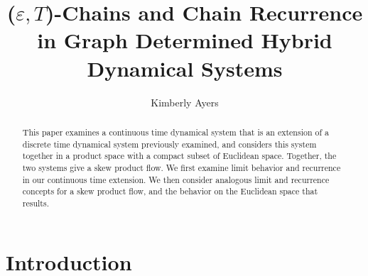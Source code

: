 \documentclass[11pt]{article}
\title{($\varepsilon,T$)-Chains and Chain Recurrence in Graph Determined Hybrid Dynamical Systems }
\author{Kimberly Ayers}
\affil{Pomona College}
\date{}
\begin{document}
\maketitle


\begin{abstract}
This paper examines a continuous time dynamical system that is an extension of a discrete time dynamical system previously examined, and considers this system together in a product space with a compact subset of Euclidean space. Together, the two systems give a skew product flow.  We first examine limit behavior and recurrence in our continuous time extension.  We then consider analogous limit and recurrence concepts for a skew product flow, and the behavior on the Euclidean space that results. 
\end{abstract}

\section{Introduction}
\vspace{2mm}
\end{document}
